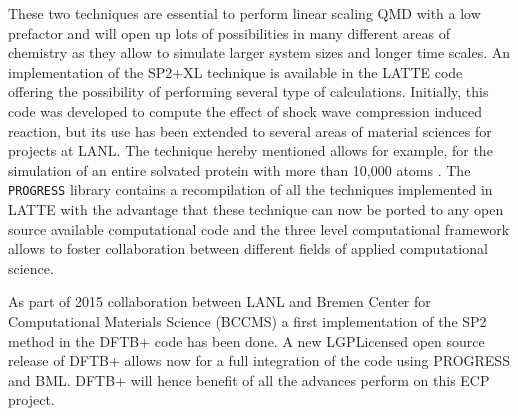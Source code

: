 These two techniques are essential to perform linear scaling QMD with a low prefactor and will open up lots of possibilities in many different areas of chemistry as they allow to simulate larger system sizes and longer time scales.
An implementation of the SP2+XL technique is available in the LATTE\cite{Sanville2010} code offering the possibility of performing several type of calculations. Initially, this code was developed to compute the effect of shock wave compression induced reaction\cite{Cawkwell}, but its use has been extended to several areas of material sciences for projects at LANL. The technique hereby mentioned allows for example, for the simulation of an entire solvated protein with more than 10,000 atoms \cite{Mniszewski2015}. 
The \texttt{PROGRESS}
library contains a recompilation of all the techniques implemented in LATTE with the advantage that these technique can now be ported to any open source available computational code and the three level computational framework allows to foster collaboration between different fields of applied computational science. 

As part of 2015 collaboration between LANL and Bremen Center for Computational Materials Science (BCCMS) a first implementation of the SP2 method 
in the DFTB+ code has been done. A new  LGPL\-icensed open source release of DFTB+ allows now for a full integration of the code using PROGRESS and BML.
DFTB+ will hence benefit of all the advances perform on this ECP project. 


% 
%  




